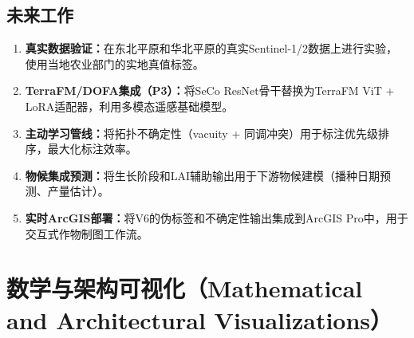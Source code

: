 \documentclass[12pt,a4paper]{ctexart}
\begin{document}
\subsection{未来工作}

\begin{enumerate}
    \item \textbf{真实数据验证：}在东北平原和华北平原的真实Sentinel-1/2数据上进行实验，使用当地农业部门的实地真值标签。
    \item \textbf{TerraFM/DOFA集成（P3）：}将SeCo ResNet骨干替换为TerraFM ViT + LoRA适配器，利用多模态遥感基础模型。
    \item \textbf{主动学习管线：}将拓扑不确定性（vacuity + 同调冲突）用于标注优先级排序，最大化标注效率。
    \item \textbf{物候集成预测：}将生长阶段和LAI辅助输出用于下游物候建模（播种日期预测、产量估计）。
    \item \textbf{实时ArcGIS部署：}将V6的伪标签和不确定性输出集成到ArcGIS Pro中，用于交互式作物制图工作流。
\end{enumerate}

\newpage





\newpage
\section{数学与架构可视化（Mathematical and Architectural Visualizations）}


\appendix




\end{document}

